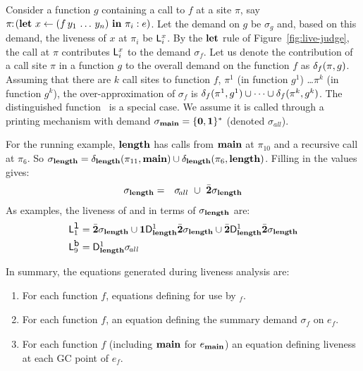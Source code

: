 \documentclass[9pt]{sigplanconf}
\begin{document}
Consider a function $g$ containing a  call to $f$ at a site $\pi$, say
$\pi\!\!:\!(\mbox{$\mathbf{ let}$}~x   \leftarrow   (f\,y_1\,\ldots\,y_n)~\mbox{$\mathbf{ in}$}~\pi_i:e)$.
Let the  demand on $g$  be $\sigma_g$ and,  based on this  demand, the
liveness of  $x$ at $\pi_i$ be  $\mathsf{L}_{{i}}^{x}$.  By the  $\mbox{$\mathbf{ let}$}$ rule of
Figure~\ref{fig:live-judge},    the   call   at    $\pi$   contributes
$\mathsf{L}_{{i}}^{x}$ to the demand $\sigma_f$. Let us denote the contribution
of a call  site $\pi$ in a  function $g$ to the overall  demand on the
function $f$  as $\delta_{f}({\pi},{g})$. Assuming that  there are $k$
call sites to function $f$, $\pi^1$ (in function $g^1$) \ldots $\pi^k$
(in   function  $g^k$),  the   over-approximation  of   $\sigma_f$  is
$\delta_{f}({\pi^1},{g^1})          \cup          \cdots          \cup
\delta_{f}({\pi^k},{g^k})$.  The distinguished function \mainpgm\ is a
special case.   We assume  it is called  through a  printing mechanism
with   demand   $\sigma_{\mathbf{main}}   =  \{\mathbf{0},\mathbf{1}\}^\ast$   (denoted
$\sigma_{\!all}$).


For  the  running  example,   $\mathbf{length}$  has  calls  from  $\mathbf{main}$  at
$\pi_{10}$ and a recursive call at $\pi_6$.
So $\sigma_{\mathbf{length}} =
     \delta_{\mathbf{length}}({\pi_{11}},{\mathbf{main}})  \cup 
\delta_{\mathbf{length}}({\pi_6},{\mathbf{length}})$.
Filling in  the values gives:
\begin{eqnarray*}
\sigma_{\mathbf{length}}    &=&
 \sigma_{\!all}  ~\cup~{\bar{\mathbf{2}}\sigma_{\mathit{\mathbf{length}}}}
\end{eqnarray*}
As examples, the liveness of  and  in terms
of  $\sigma_{\mathbf{length}}$ are:
\begin{align*}
\mathsf{L}_{{1}}^{\mbox{\tt l}} &= \bar{\mathbf{2}}\sigma_{\mathbf{length}} \cup \mathbf{1}\mathsf{D}_{\mathit {\mathbf{length}}}^{1}\bar{\mathbf{2}}\sigma_{\mathbf{length}}
  \cup \bar{\mathbf{2}}\mathsf{D}_{\mathit {\mathbf{length}}}^{1}{\bar{\mathbf{2}}\sigma_{\mathbf{length}}}
 \\
\mathsf{L}_{{9}}^{\mbox{\tt b}} &= \mathsf{D}_{\mathit {\mathbf{length}}}^{1}\sigma_{\mathit{\!all}}
\end{align*}

In summary, the equations generated during liveness analysis are:
\begin{enumerate}
\item   For    each   function   $\mathit{f}$,    equations   defining
 for use by \Lfonly$_{\mathit f}$.
\item  For  each   function  $\mathit{f}$, an  equation  defining
the summary demand  $\sigma_{\mathit f}$ on $e_f$.
\item For each function $\mathit{f}$ (including $\mathbf{main}$ for
  $e_{\mathbf{main}}$) 
an equation defining
  liveness at each GC point of $e_{\mathit f}$.
\end{enumerate}
\end{document}
